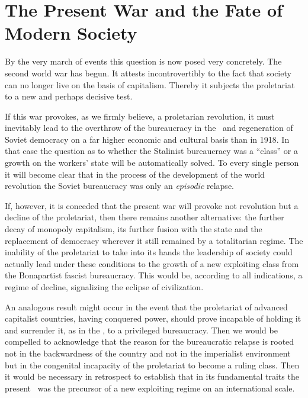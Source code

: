 \section*{The Present War and the Fate of Modern Society}

By the very march of events this question is now posed very concretely. The second world war has begun. It attests incontrovertibly to the fact that society can no longer live on the basis of capitalism. Thereby it subjects the proletariat to a new and perhaps decisive test.

If this war provokes, as we firmly believe, a proletarian revolution, it must inevitably lead to the overthrow of the bureaucracy in the \USSR\ and regeneration of Soviet democracy on a far higher economic and cultural basis than in 1918. In that case the question as to whether the Stalinist bureaucracy was a “class” or a growth on the workers’ state will be automatically solved. To every single person it will become clear that in the process of the development of the world revolution the Soviet bureaucracy was only an \emph{episodic} relapse.

If, however, it is conceded that the present war will provoke not revolution but a decline of the proletariat, then there remains another alternative: the further decay of monopoly capitalism, its further fusion with the state and the replacement of democracy wherever it still remained by a totalitarian regime. The inability of the proletariat to take into its hands the leadership of society could actually lead under these conditions to the growth of a new exploiting class from the Bonapartist fascist bureaucracy. This would be, according to all indications, a regime of decline, signalizing the eclipse of civilization.
\noclub

An analogous result might occur in the event that the proletariat of advanced capitalist countries, having conquered power, should prove incapable of holding it and surrender it, as in the \USSR, to a privileged bureaucracy. Then we would be compelled to acknowledge that the reason for the bureaucratic relapse is rooted not in the backwardness of the country and not in the imperialist environment but in the congenital incapacity of the proletariat to become a ruling class. Then it would be necessary in retrospect to establish that in its fundamental traits the present \USSR\ was the precursor of a new exploiting regime on an international scale.

